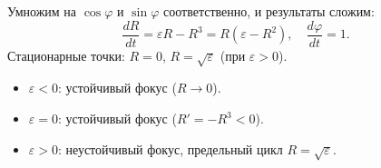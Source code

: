 	Умножим на $\cos\varphi$ и $\sin\varphi$ соответственно, и результаты сложим:
	\begin{equation}
		\frac{d R}{d t} = \varepsilon R - R^3 = R (\varepsilon - R^2), \quad \frac{d \varphi}{d t} = 1.
	\end{equation}
	Стационарные точки: \( R = 0 \), \( R = \sqrt{\varepsilon} \) (при \(\varepsilon > 0\)).  
	\begin{itemize}
		\item \(\varepsilon < 0\): устойчивый фокус (\( R \to 0 \)).
		\item \(\varepsilon = 0\): устойчивый фокус (\( R' = -R^3 < 0 \)).
		\item \(\varepsilon > 0\): неустойчивый фокус, предельный цикл \( R = \sqrt{\varepsilon} \).
	\end{itemize}
	\vspace{-1em}
